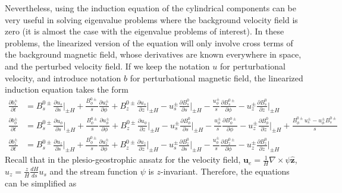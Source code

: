 Nevertheless, using the induction equation of the cylindrical components can be very useful in solving eigenvalue problems where the background velocity field is zero (it is almost the case with the eigenvalue problems of interest).
In these problems, the linearized version of the equation will only involve cross terms of the background magnetic field, whose derivatives are known everywhere in space, and the perturbed velocity field. If we keep the notation $u$ for perturbational velocity, and introduce notation $b$ for perturbational magnetic field, the linearized induction equation takes the form
\[\begin{aligned}
    \frac{\partial b_s^\pm}{\partial t} &= B_s^{0\pm} \frac{\partial u_s}{\partial s}\bigg|_{\pm H} + \frac{B_\phi^{0\pm}}{s} \frac{\partial u_s^\pm}{\partial \phi} + B_z^{0\pm} \frac{\partial u_s}{\partial z}\bigg|_{\pm H} - u_s^\pm \frac{\partial B_s^0}{\partial s}\bigg|_{\pm H} - \frac{u_\phi^\pm}{s} \frac{\partial B_s^{0\pm}}{\partial \phi} - u_z^\pm \frac{\partial B_s^0}{\partial z}\bigg|_{\pm H} \\ 
    \frac{\partial b_\phi^\pm}{\partial t} &= B_s^{0\pm} \frac{\partial u_\phi}{\partial s}\bigg|_{\pm H} + \frac{B_\phi^{0\pm}}{s} \frac{\partial u_\phi^\pm}{\partial \phi} + B_z^{0\pm} \frac{\partial u_\phi}{\partial z}\bigg|_{\pm H} - u_s^\pm \frac{\partial B_\phi^0}{\partial s}\bigg|_{\pm H} - \frac{u_\phi^\pm}{s} \frac{\partial B_\phi^{0\pm}}{\partial \phi} - u_z^\pm \frac{\partial B_\phi^0}{\partial z}\bigg|_{\pm H} + \frac{B_\phi^{0\pm} u_s^\pm - u^\pm_\phi B_s^{0\pm}}{s}\\ 
    \frac{\partial b_z^\pm}{\partial t} &= B_s^{0\pm} \frac{\partial u_z}{\partial s}\bigg|_{\pm H} + \frac{B_\phi^{0\pm}}{s} \frac{\partial u_z^\pm}{\partial \phi} + B_z^{0\pm} \frac{\partial u_z}{\partial z}\bigg|_{\pm H} - u_s^\pm \frac{\partial B_z^0}{\partial s}\bigg|_{\pm H} - \frac{u_\phi^\pm}{s} \frac{\partial B_z^{0\pm}}{\partial \phi} - u_z^\pm \frac{\partial B_z^0}{\partial z}\bigg|_{\pm H}
\end{aligned}\]
Recall that in the plesio-geostrophic ansatz for the velocity field, $\mathbf{u}_e = \frac{1}{H}\nabla\times \psi \hat{\mathbf{z}}$, $u_z = \frac{z}{H}\frac{dH}{ds} u_s$ and the stream function $\psi$ is $z$-invariant. Therefore, the equations can be simplified as
